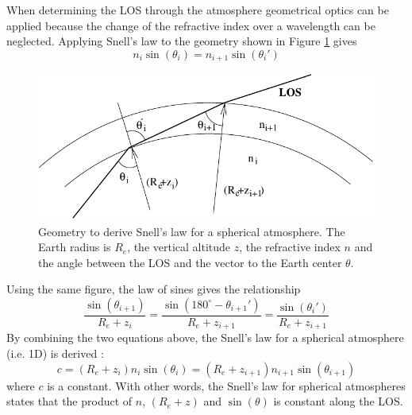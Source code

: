   \label{sec:los:reftheory}

   When determining the LOS through the atmosphere geometrical optics 
   can be applied because the change of the refractive index over a
   wavelength can be neglected. Applying Snell's law to the geometry 
   shown in Figure \ref{fig:los:snell} gives
   \begin{equation}
     n_i \sin (\theta_i) = n_{i+1} \sin (\theta_i')
   \end{equation}
   \begin{figure}
    \begin{center}
      \includegraphics*{Figs/snell}
      \caption{Geometry to derive Snell's law for a spherical atmosphere. 
               The Earth radius is $R_e$, the vertical
               altitude $z$, the refractive index $n$ and the angle
               between the LOS and the vector to the Earth center $\theta$.}
      \label{fig:los:snell} 
    \end{center} 
  \end{figure}
  Using the same figure, the law of sines gives the relationship
  \begin{equation}
    \frac{\sin(\theta_{i+1})}{R_e+z_i} = 
    \frac{\sin(180^\circ-\theta_{i+1}')}{R_e+z_{i+1}} =
    \frac{\sin(\theta_i')}{R_e+z_{i+1}} 
  \end{equation}
  By combining the two equations above, the Snell's law for a spherical
  atmosphere (i.e. 1D) is derived \citep[e.g.][]{kyle:91,balluch:97}:
  \begin{equation}
    c = (R_e+z_i) n_i \sin(\theta_i) = (R_e+z_{i+1}) n_{i+1}\sin(\theta_{i+1}) 
   \label{eq:los:snellspherical}
  \end{equation}
  where $c$ is a constant. With other words, the Snell's law for spherical
  atmospheres states that the product of $n$, $(R_e+z)$ and $\sin(\theta)$ is
  constant along the LOS.


